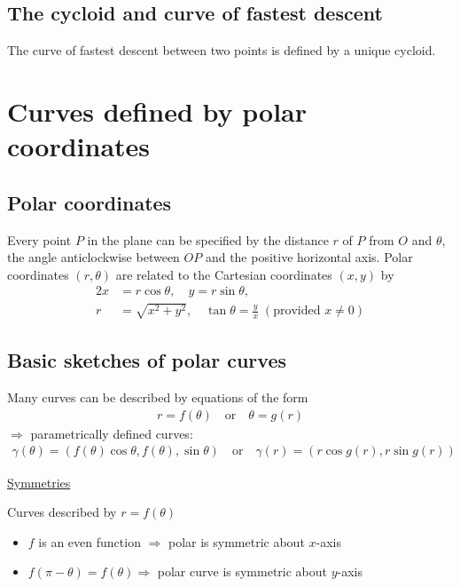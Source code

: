 \documentclass{report}
\begin{document}
		\subsection{The cycloid and curve of fastest descent}

			The curve of fastest descent between two points is defined by a unique cycloid.
	
	\section{Curves defined by polar coordinates}

		\subsection{Polar coordinates}

			Every point $P$ in the plane can be specified by the distance $r$ of $P$ from $O$ and $\theta$, the angle anticlockwise between $OP$ and the positive horizontal axis. Polar coordinates $(r, \theta)$ are related to the Cartesian coordinates $(x,y)$ by
				\begin{alignat*}{2}
					x &= r\cos\theta, \quad y = r \sin \theta,	\\
					r &= \sqrt{x^2 + y^2}, \quad \tan\theta = \frac{y}{x} \; (\text{provided } x \neq 0)
				\end{alignat*}

		\subsection{Basic sketches of polar curves}

			Many curves can be described by equations of the form
				\begin{align*}
					r = f(\theta) \quad \text{or} \quad \theta = g(r)
				\end{align*}
			$\Longrightarrow$ parametrically defined curves:
				\begin{align*}
					\gamma(\theta) = (f(\theta)\cos\theta,f(\theta),\sin\theta) \quad \text{or} \quad \gamma(r) = (r\cos g(r), r \sin g(r))
				\end{align*}

			\underline{Symmetries}

			Curves described by $r = f(\theta)$
			\begin{itemize}
				\item $f$ is an even function $\Longrightarrow$ polar is symmetric about $x$-axis
				\item $f(\pi - \theta) = f(\theta) \Longrightarrow$ polar curve is symmetric about $y$-axis
			\end{itemize}
\end{document}
